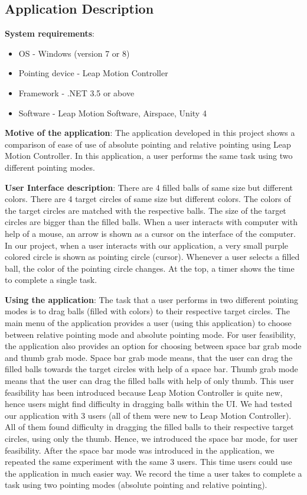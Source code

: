 \documentclass[titlepage]{article}
\begin{document}
\subsection{Application Description}

{\bf System requirements}:
\begin{itemize}
\item OS - Windows (version 7 or 8)
\item Pointing device - Leap Motion Controller
\item Framework - .NET 3.5 or above
\item Software - Leap Motion Software, Airspace, Unity 4 
\end{itemize}

{\bf Motive of the application}: The application developed in this project shows a comparison of ease of use of absolute pointing and relative pointing using Leap Motion Controller. In this application, a user performs the same task using two different pointing modes. 

{\bf User Interface description}: There are 4 filled balls of same size but different colors. There are 4 target circles of same size but different colors. The colors of the target circles are matched with the respective balls. The size of the target circles are bigger than the filled balls. When a user interacts with computer with help of a mouse, an arrow is shown as a cursor on the interface of the computer. In our project, when a user interacts with our application, a very small purple colored circle is shown as pointing circle (cursor). Whenever a user selects a filled ball, the color of the pointing circle changes. At the top, a timer shows the time to complete a single task.

{\bf Using the application}: The task that a user performs in two different pointing modes is to drag balls (filled with colors) to their respective target circles. The main menu of the application  provides a user (using this application) to choose between relative pointing mode and absolute pointing mode. For user feasibility, the application also provides an option for choosing between space bar grab mode and thumb grab mode. Space bar grab mode means, that the user can drag the filled balls towards the target circles with help of a space bar. Thumb grab mode means that the user can drag the filled balls with help of only thumb. This user feasibility has been introduced because Leap Motion Controller is quite new, hence users might find difficulty in dragging balls within the UI. We had tested our application with 3 users (all of them were new to Leap Motion Controller). All of them found difficulty in dragging the filled balls to their respective target circles, using only the thumb. Hence, we introduced the space bar mode, for user feasibility. After the space bar mode was introduced in the application, we repeated the same experiment with the same 3 users. This time users could use the application in much easier way. We record the time a user takes to complete a task using two pointing modes (absolute pointing and relative pointing).
\end{document}
